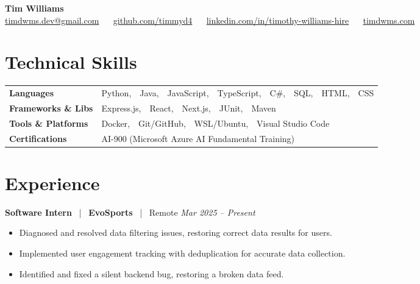 \documentclass[10pt, letterpaper]{article}
\newcommand{\jobhead}[4]{%
  \vspace{5pt}%
  {\bfseries\color{dark}#1}%
  ~{\color{light}|}~%
  {\bfseries\color{navy}#2}%
  ~{\color{light}|}~%
  {\color{light}#3}%
  \hfill{\color{light}\small\textit{#4}}\\[-2pt]%
}
\newcommand{\skillrow}[2]{%
  {\bfseries #1} & #2 \\[2pt]%
}
\begin{document}

\begin{center}
  {\huge\bfseries\color{navy} Tim Williams}\\[4pt]
  {\small\color{light}
    \href{mailto:timdwms.dev@gmail.com}{timdwms.dev@gmail.com}
    ~\textbullet~
    \href{https://github.com/timmyd4}{github.com/timmyd4}
    ~\textbullet~
    \href{https://www.linkedin.com/in/timothy-williams-hire}{linkedin.com/in/timothy-williams-hire}
    ~\textbullet~
    \href{https://timdwms.com}{timdwms.com}
  }
\end{center}

\vspace{2pt}

\section{Technical Skills}

\begin{tabular}{@{}p{1.6in} p{5.2in}@{}}
  \skillrow{Languages}{Python,\ \ Java,\ \ JavaScript,\ \ TypeScript,\ \ C\#,\ \ SQL,\ \ HTML,\ \ CSS}
  \skillrow{Frameworks \& Libs}{Express.js,\ \ React,\ \ Next.js,\ \ JUnit,\ \ Maven}
  \skillrow{Tools \& Platforms}{Docker,\ \ Git/GitHub,\ \ WSL/Ubuntu,\ \ Visual Studio Code}
  \skillrow{Certifications}{AI-900 (Microsoft Azure AI Fundamental Training)}
\end{tabular}

\section{Experience}

\jobhead{Software Intern}{EvoSports}{Remote}{Mar 2025 – Present}
\begin{itemize}
  \item Diagnosed and resolved data filtering issues, restoring correct data results for users.
  \item Implemented user engagement tracking with deduplication for accurate data collection.
  \item Identified and fixed a silent backend bug, restoring a broken data feed.
\end{itemize}
\end{document}

